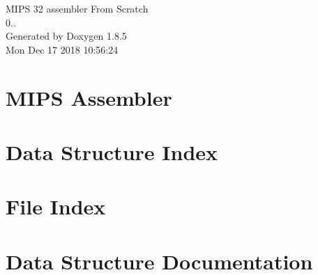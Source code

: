 \documentclass[twoside]{book}
\newcommand{\clearemptydoublepage}{%
  \newpage{\pagestyle{empty}\cleardoublepage}%
}
\begin{document}
\hypersetup{pageanchor=false}
\begin{titlepage}
\vspace*{7cm}
\begin{center}%
{\Large M\-I\-P\-S 32 assembler From Scratch \\[1ex]\large 0.. }\\
\vspace*{1cm}
{\large Generated by Doxygen 1.8.5}\\
\vspace*{0.5cm}
{\small Mon Dec 17 2018 10:56:24}\\
\end{center}
\end{titlepage}
\clearemptydoublepage
\tableofcontents
\clearemptydoublepage
{}
\hypersetup{pageanchor=true}

\chapter{M\-I\-P\-S Assembler}
\label{index}\hypertarget{index}{}
\chapter{Data Structure Index}

\chapter{File Index}

\chapter{Data Structure Documentation}




























\end{document}
